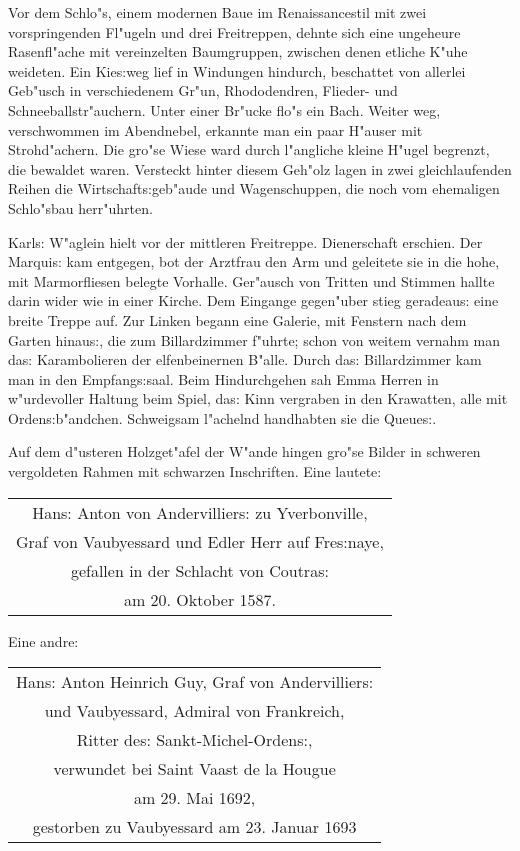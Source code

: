 \documentclass[oneside,12pt]{book}
\newcommand{\s}{s:}%
\begin{document}
Vor dem Schlo"s, einem modernen Baue im Renaissancestil mit zwei
vorspringenden Fl"ugeln und drei Freitreppen, dehnte sich eine
ungeheure Rasenfl"ache mit vereinzelten Baumgruppen, zwischen
denen etliche K"uhe weideten. Ein Kie{\s}weg lief in Windungen
hindurch, beschattet von allerlei Geb"usch in verschiedenem Gr"un,
Rhododendren, Flieder- und Schneeballstr"auchern. Unter einer
Br"ucke flo"s ein Bach. Weiter weg, verschwommen im Abendnebel,
erkannte man ein paar H"auser mit Strohd"achern. Die gro"se Wiese
ward durch l"angliche kleine H"ugel begrenzt, die bewaldet waren.
Versteckt hinter diesem Geh"olz lagen in zwei gleichlaufenden
Reihen die Wirtschaft{\s}geb"aude und Wagenschuppen, die noch vom
ehemaligen Schlo"sbau herr"uhrten.

Karl{\s} W"aglein hielt vor der mittleren Freitreppe. Dienerschaft
erschien. Der Marqui{\s} kam entgegen, bot der Arztfrau den Arm
und geleitete sie in die hohe, mit Marmorfliesen belegte Vorhalle.
Ger"ausch von Tritten und Stimmen hallte darin wider wie in einer
Kirche. Dem Eingange gegen"uber stieg geradeau{\s} eine breite
Treppe auf. Zur Linken begann eine Galerie, mit Fenstern nach dem
Garten hinau{\s}, die zum Billardzimmer f"uhrte; schon von weitem
vernahm man da{\s} Karambolieren der elfenbeinernen B"alle. Durch
da{\s} Billardzimmer kam man in den Empfang{\s}saal. Beim
Hindurchgehen sah Emma Herren in w"urdevoller Haltung beim Spiel,
da{\s} Kinn vergraben in den Krawatten, alle mit
Orden{\s}b"andchen. Schweigsam l"achelnd handhabten sie die
Queue{\s}.

Auf dem d"usteren Holzget"afel der W"ande hingen gro"se Bilder in
schweren vergoldeten Rahmen mit schwarzen Inschriften. Eine
lautete:

\begin{center}
\begin{tabular}{|c|}
\hline
Han{\s} Anton von Andervillier{\s} zu Yverbonville, \\
Graf von Vaubyessard und Edler Herr auf Fre{\s}naye, \\
gefallen in der Schlacht von Coutra{\s} \\
am 20. Oktober 1587. \\
\hline
\end{tabular}
\end{center}

Eine andre:

\begin{center}
\begin{tabular}{|c|}
\hline
Han{\s} Anton Heinrich Guy, Graf von Andervillier{\s} \\
und Vaubyessard, Admiral von Frankreich, \\
Ritter de{\s} Sankt-Michel-Orden{\s}, \\
verwundet bei Saint Vaast de la Hougue \\
am 29. Mai 1692, \\
gestorben zu Vaubyessard am 23. Januar 1693 \\
\hline
\end{tabular}
\end{center}
\end{document}
